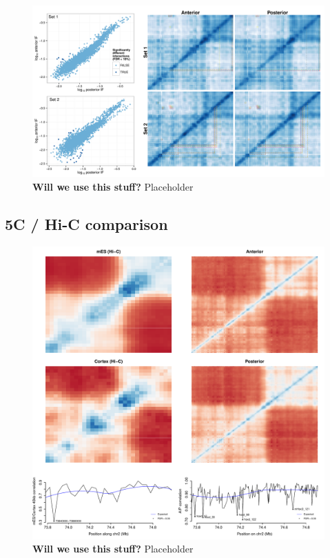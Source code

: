 \documentclass[a4paper,10pt,oneside]{book}
\begin{document}
\begin{figure}
\begin{center} 
\includegraphics[width=\textwidth]{figs/5cdiff.pdf}
\captionsetup{width=\textwidth} 
\caption{ {\bf Will we use this stuff? }
Placeholder
}\label{fig:5cdiff}
\end{center} 
\end{figure} 


\subsection{5C / Hi-C comparison}

\begin{figure}
\begin{center} 
\includegraphics[width=\textwidth]{figs/5chic.pdf}
\captionsetup{width=\textwidth} 
\caption{ {\bf Will we use this stuff? }
Placeholder
}\label{fig:5cdiff}
\end{center} 
\end{figure} 


\ifstandalone
\begin{small}

\end{small}
\fi
\end{document}
